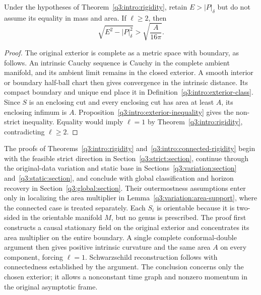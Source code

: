 \begin{corollary}
\label{q3:rigidity:finite-strictness}
Under the hypotheses of Theorem~\ref{q3:intro:rigidity}, retain
$E>|P|_\delta$ but do not assume its equality in mass and area.
If $\ell\geq2$, then
\[
\sqrt{E^2-|P|_\delta^2}>\sqrt{\frac{A}{16\pi}}.
\]
\end{corollary}

\begin{proof}
The original exterior is complete as a metric space with boundary,
as follows. An intrinsic Cauchy sequence is Cauchy in the complete
ambient manifold, and its ambient limit remains in the closed exterior.
A smooth interior or boundary half-ball chart then gives convergence
in the intrinsic distance. Its compact
boundary and unique end place it in
Definition~\ref{q3:intro:exterior-class}. Since $S$ is an enclosing cut
and every enclosing cut has area at least $A$, its enclosing infimum
is $A$. Proposition~\ref{q3:intro:exterior-inequality} gives the non-strict
inequality. Equality would imply $\ell=1$ by
Theorem~\ref{q3:intro:rigidity}, contradicting $\ell\geq2$.
\end{proof}

The proofs of Theorems~\ref{q3:intro:rigidity}
and~\ref{q3:intro:connected-rigidity} begin with the feasible strict
direction in Section~\ref{q3:strict:section}, continue through the
original-data variation and static base in
Sections~\ref{q3:variation:section} and~\ref{q3:static:section},
and conclude with global classification and horizon recovery in
Section~\ref{q3:global:section}.
Their outermostness assumptions enter only in localizing the area
multiplier in Lemma~\ref{q3:variation:area-support}, where the
connected case is treated separately. Each $S_i$ is orientable because it is two-sided in the
orientable manifold $M$, but no genus is prescribed. The proof first
constructs a causal stationary field on the original exterior and
concentrates its area multiplier on the entire boundary. A single
complete conformal-double argument then gives positive intrinsic
curvature and the same area $A$ on every component, forcing
$\ell=1$. Schwarzschild reconstruction follows with connectedness
established by the argument. The conclusion concerns only the chosen
exterior; it allows a nonconstant time graph and nonzero momentum in
the original asymptotic frame.

